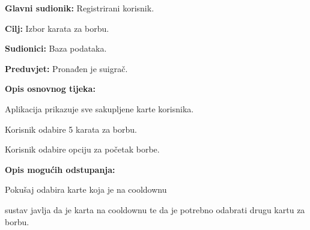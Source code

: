 				\noindent {}
				\begin{packed_item}
					
					\item \textbf{Glavni sudionik: }Registrirani korisnik.
					\item  \textbf{Cilj:} Izbor karata za borbu.
					\item  \textbf{Sudionici:} Baza podataka.
					\item  \textbf{Preduvjet:} Pronađen je suigrač.
					\item  \textbf{Opis osnovnog tijeka:}
					
					\item[] \begin{packed_enum}
						
						\item Aplikacija prikazuje sve sakupljene karte korisnika.
						\item Korisnik odabire 5 karata za borbu. 
						\item Korisnik odabire opciju za početak borbe.
					\end{packed_enum}
					
					\item  \textbf{Opis mogućih odstupanja:}
					
					\item[] \begin{packed_item}
						
						\item[2.a] Pokušaj odabira karte koja je na cooldownu
						\item[] \begin{packed_enum}
							
							\item  sustav javlja da je karta na cooldownu te da je potrebno odabrati drugu kartu za borbu.
							
						\end{packed_enum}
						
					\end{packed_item}
				\end{packed_item}
				
